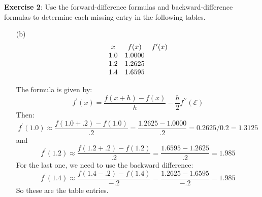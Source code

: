 \documentclass{article}
\begin{document}
\textbf{Exercise 2}: Use the forward-difference formulas and backward-difference formulas to determine each missing entry in the following tables.
    \begin{itemize}
        \item [(b)] \begin{align*}
            \begin{array}{ c c c }
                x   & f(x)   & f^{\prime}(x) \\
                1.0 & 1.0000 &               \\
                1.2 & 1.2625 &               \\
                1.4 & 1.6595 &                 
            \end{array}
        \end{align*}
        \begin{answer}
            The formula is given by:
                \begin{equation*}
                    f^{\prime}(x) = \dfrac{f(x + h) - f(x)}{h} - \dfrac{h}{2}f^{\prime\prime}(\mathcal{E})
                \end{equation*}
            Then:
                \begin{equation*}
                    f^{\prime}(1.0) \approx \dfrac{f(1.0 + .2) - f(1.0)}{.2} = \dfrac{1.2625 - 1.0000}{.2} = 0.2625 / 0.2 = 1.3125
                \end{equation*}
            and
                \begin{equation*}
                    f^{\prime}(1.2) \approx \dfrac{f(1.2 + .2) - f(1.2)}{.2} = \dfrac{1.6595 - 1.2625}{.2} = 1.985
                \end{equation*}
            For the last one, we need to use the backward difference:
                \begin{equation*}
                    f^{\prime}(1.4) \approx \dfrac{f(1.4 - .2) - f(1.4)}{-.2} = \dfrac{1.2625 - 1.6595}{-.2} = 1.985
                \end{equation*}
            So these are the table entries.
        \end{answer}
    \end{itemize}
\end{document}
